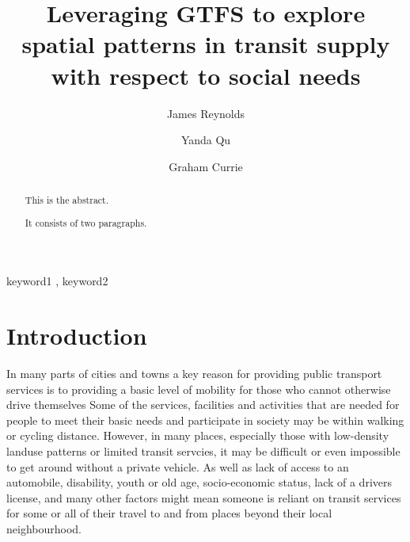 \documentclass[preprint, 3p,
authoryear]{elsarticle} %
\begin{document}
\begin{frontmatter}

  \title{Leveraging GTFS to explore spatial patterns in transit supply
with respect to social needs}
    \author[Public Transport Research Group (PTRG)]{James Reynolds%
  }
    \author[Public Transport Research Group (PTRG)]{Yanda Qu%
  }
    \author[Public Transport Research Group (PTRG)]{Graham Currie%
  }
  
  \begin{abstract}
  This is the abstract.

  It consists of two paragraphs.
  \end{abstract}
    \begin{keyword}
    keyword1 \sep 
    keyword2
  \end{keyword}
  
 \end{frontmatter}

\section{Introduction}\label{introduction}

In many parts of cities and towns a key reason for providing public
transport services is to providing a basic level of mobility for those
who cannot otherwise drive themselves Some of the services, facilities
and activities that are needed for people to meet their basic needs and
participate in society may be within walking or cycling distance.
However, in many places, especially those with low-density landuse
patterns or limited transit servcies, it may be difficult or even
impossible to get around without a private vehicle. As well as lack of
access to an automobile, disability, youth or old age, socio-economic
status, lack of a drivers license, and many other factors might mean
someone is reliant on transit services for some or all of their travel
to and from places beyond their local neighbourhood.
\end{document}

